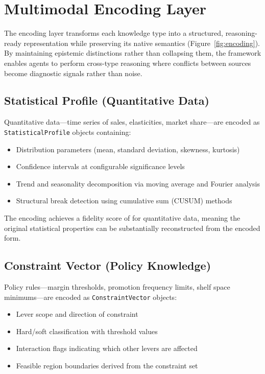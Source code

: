 \section{Multimodal Encoding Layer}
\label{sec:encoding}

The encoding layer transforms each knowledge type into a structured, reasoning-ready representation while preserving its native semantics (Figure~\ref{fig:encoding}).
By maintaining epistemic distinctions rather than collapsing them, the framework enables agents to perform cross-type reasoning where conflicts between sources become diagnostic signals rather than noise.

\subsection{Statistical Profile (Quantitative Data)}

Quantitative data---time series of sales, elasticities, market share---are encoded as \texttt{StatisticalProfile} objects containing:
\begin{itemize}
    \item Distribution parameters (mean, standard deviation, skewness, kurtosis)
    \item Confidence intervals at configurable significance levels
    \item Trend and seasonality decomposition via moving average and Fourier analysis
    \item Structural break detection using cumulative sum (CUSUM) methods
\end{itemize}

The encoding achieves a fidelity score of \FIDELITYQUANT{} for quantitative data, meaning the original statistical properties can be substantially reconstructed from the encoded form.

\subsection{Constraint Vector (Policy Knowledge)}

Policy rules---margin thresholds, promotion frequency limits, shelf space minimums---are encoded as \texttt{ConstraintVector} objects:
\begin{itemize}
    \item Lever scope and direction of constraint
    \item Hard/soft classification with threshold values
    \item Interaction flags indicating which other levers are affected
    \item Feasible region boundaries derived from the constraint set
\end{itemize}

